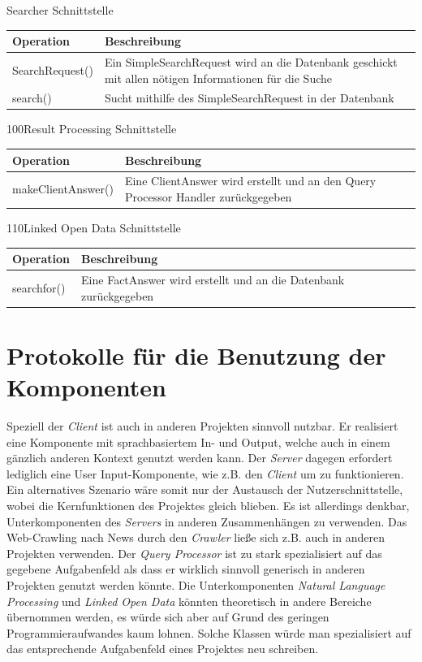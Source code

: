 \begin{interface}{90}{Searcher Schnittstelle}
\begin{tabular}[ht]{|p{4cm}|p{10cm}|}
\hline
Operation & Beschreibung\\
\hline
SearchRequest() & Ein SimpleSearchRequest wird an die Datenbank
geschickt mit allen nötigen Informationen für die Suche\\
\hline
search() & Sucht mithilfe des SimpleSearchRequest in der Datenbank\\
\hline
 \end{tabular}
\end{interface}

\begin{interface}{100}{Result Processing Schnittstelle}
\begin{tabular}[ht]{|p{4cm}|p{10cm}|}
\hline
Operation & Beschreibung\\
\hline
makeClientAnswer() & Eine ClientAnswer wird erstellt und an den Query Processor
Handler zurückgegeben\\
\hline
 \end{tabular}
\end{interface}

\begin{interface}{110}{Linked Open Data Schnittstelle}
\begin{tabular}[ht]{|p{4cm}|p{10cm}|}
\hline
Operation & Beschreibung\\
\hline
searchfor() & Eine FactAnswer wird erstellt und an die Datenbank zurückgegeben\\
\hline
 \end{tabular}
\end{interface}



\section{Protokolle für die Benutzung der Komponenten}

Speziell der \textit{Client} ist auch in anderen Projekten sinnvoll nutzbar.
Er realisiert eine Komponente mit sprachbasiertem In- und Output, welche auch in einem gänzlich anderen Kontext genutzt werden kann.
Der \textit{Server} dagegen erfordert lediglich eine User Input-Komponente, wie z.B. den \textit{Client} um zu funktionieren. 
Ein alternatives Szenario wäre somit nur der Austausch der Nutzerschnittstelle, wobei die Kernfunktionen des Projektes gleich blieben.
Es ist allerdings denkbar, Unterkomponenten des \textit{Servers} in anderen Zusammenhängen zu verwenden.
Das Web-Crawling nach News durch den \textit{Crawler} ließe sich z.B. auch in anderen Projekten verwenden.
Der \textit{Query Processor} ist zu stark spezialisiert auf das gegebene Aufgabenfeld als dass er wirklich sinnvoll generisch in anderen Projekten genutzt werden könnte. Die Unterkomponenten \textit{Natural Language Processing} und \textit{Linked Open Data} könnten
theoretisch in andere Bereiche übernommen werden, es würde sich aber auf Grund des geringen Programmieraufwandes kaum lohnen.
Solche Klassen würde man spezialisiert auf das entsprechende Aufgabenfeld eines Projektes neu schreiben.

